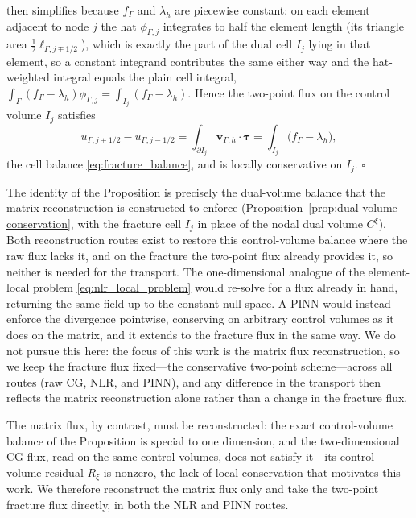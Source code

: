 \documentclass[a4paper,fleqn]{cas-sc}
\newcommand{\vflux}{\mathbf{v}}
\begin{document}
{then simplifies because \(f_\Gamma\) and \(\lambda_h\) are piecewise constant: on
each element adjacent to node \(j\) the hat \(\phi_{\Gamma,j}\) integrates to half
the element length (its triangle area \(\tfrac12\ell_{\Gamma,j\mp1/2}\)), which is
exactly the part of the dual cell \(I_j\) lying in that element, so a constant
integrand contributes the same either way and the hat-weighted integral equals the
plain cell integral,
\(\int_\Gamma(f_\Gamma-\lambda_h)\phi_{\Gamma,j}=\int_{I_j}(f_\Gamma-\lambda_h)\).
Hence the two-point flux on the control volume \(I_j\) satisfies
\[
u_{\Gamma,j+1/2}-u_{\Gamma,j-1/2}=\int_{\partial I_j}\vflux_{\Gamma,h}\cdot\bm\tau
=\int_{I_j}\bigl(f_\Gamma-\lambda_h\bigr),
\]
the cell balance \eqref{eq:fracture_balance}, and is locally conservative on
\(I_j\). \(\square\)

The identity of the Proposition is precisely the dual-volume balance that the matrix
reconstruction is
constructed to enforce (Proposition~\ref{prop:dual-volume-conservation}, with the
fracture cell \(I_j\) in place of the nodal dual volume \(C^\xi\)). Both
reconstruction routes exist to restore this control-volume balance where the raw
flux lacks it, and on the fracture the two-point flux already provides it, so
neither is needed for the transport. The one-dimensional analogue of the
element-local problem \eqref{eq:nlr_local_problem} would re-solve for a flux already
in hand, returning the same field up to the constant null space. A PINN would
instead enforce the divergence pointwise, conserving on arbitrary control volumes as
it does on the matrix, and it extends to the fracture flux in the same way. We do
not pursue this here: the focus of this work is the matrix flux reconstruction, so we
keep the fracture flux fixed---the conservative two-point scheme---across all routes
(raw CG, NLR, and PINN), and any difference in the transport then reflects the matrix
reconstruction alone rather than a change in the fracture flux.

The matrix flux, by contrast, must be reconstructed: the exact control-volume
balance of the Proposition is special to one dimension, and the two-dimensional CG
flux, read on the same control volumes, does not satisfy it---its control-volume
residual \(R_\xi\) is nonzero, the lack of local conservation that motivates this
work. We therefore reconstruct the matrix flux only and take the two-point fracture
flux directly, in both the NLR and PINN routes.

}
\end{document}
